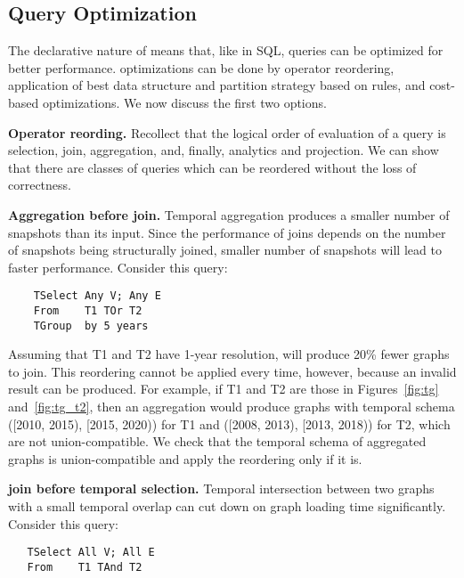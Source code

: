 \subsection{Query Optimization}
\label{sec:sys:optimization}

The declarative nature of \ql means that, like in SQL, queries can be
optimized for better performance.  \ql optimizations can be done by
operator reordering, application of best data structure and partition
strategy based on rules, and cost-based optimizations.  We now discuss
the first two options.

{\bf Operator reording.} Recollect that the logical order of
evaluation of a \ql query is selection, join, aggregation, and,
finally, analytics and projection.  We can show that there are classes
of queries which can be reordered without the loss of correctness.

{\bf Aggregation before join.}  Temporal aggregation produces a
smaller number of snapshots than its input.  Since the performance of
joins depends on the number of snapshots being structurally joined,
smaller number of snapshots will lead to faster performance.  Consider
this query:

\begin{small}
\begin{verbatim}
    TSelect Any V; Any E
    From    T1 TOr T2
    TGroup  by 5 years
\end{verbatim}
\end{small}

Assuming that T1 and T2 have 1-year resolution,  will
produce 20\% fewer graphs to join.  This reordering cannot be applied
every time, however, because an invalid result can be produced.  For
example, if T1 and T2 are those in Figures~\ref{fig:tg}
and~\ref{fig:tg_t2}, then an aggregation would produce graphs with
temporal schema ([2010, 2015), [2015, 2020)) for T1 and ([2008, 2013),
      [2013, 2018)) for T2, which are not union-compatible.  We check
        that the temporal schema of aggregated graphs is
        union-compatible and apply the reordering only if it is.

{\bf {} join before temporal selection.}  Temporal
intersection between two graphs with a small temporal overlap can cut
down on graph loading time significantly.  Consider this query:

\begin{small}
\begin{verbatim}
   TSelect All V; All E
   From    T1 TAnd T2
\end{verbatim}
\end{small}

